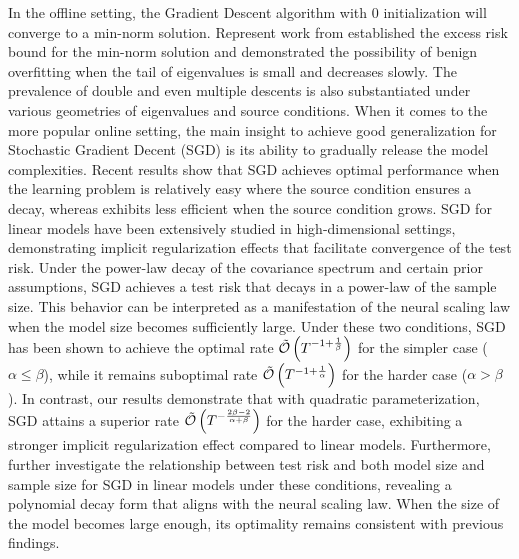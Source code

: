 
\iffalse

In the offline setting,  the Gradient Descent algorithm with $0$ initialization will converge to a min-norm solution. 
Represent work from \citep{} established the excess risk bound for the min-norm  solution and demonstrated the possibility of benign overfitting when the tail of eigenvalues is small and decreases slowly.   The prevalence of double and even multiple descents is also substantiated under various geometries of eigenvalues and source conditions.   When it comes to  the more popular online setting, the main insight to achieve good generalization for Stochastic Gradient Decent (SGD) is its ability to gradually release the model complexities. Recent results show that SGD achieves optimal performance when the learning problem is relatively easy where the source condition ensures a decay, whereas exhibits less efficient when the source condition grows.
SGD for linear models have been extensively studied in high-dimensional settings, demonstrating implicit regularization effects that facilitate convergence of the test risk. Under the power-law decay of the covariance spectrum and certain prior assumptions, SGD achieves a test risk that decays in a power-law of the sample size. This behavior can be interpreted as a manifestation of the neural scaling law when the model size becomes sufficiently large. 
Under these two conditions, SGD has been shown to achieve the optimal rate $\Tilde{\mathcal{O}} \left ( T^{-1+\frac{1}{\beta} } \right ) $ for the simpler case ($\alpha \le  \beta $), while it remains suboptimal rate $\Tilde{\mathcal{O}} \left ( T^{-1+\frac{1}{\alpha} } \right )$ for the harder case ($\alpha > \beta $). 
In contrast, our results demonstrate that with quadratic parameterization, SGD attains a superior rate $\Tilde{\mathcal{O}}\left(T^{-\frac{2\beta-2}{\alpha+\beta}}\right)$ for the harder case, exhibiting a stronger implicit regularization effect compared to linear models. 
Furthermore, \citet{lin2024scaling,bordelon2024a} further investigate the relationship between test risk and both model size and sample size for SGD in linear models under these conditions, revealing a polynomial decay form that aligns with the neural scaling law. When the size of the model becomes large enough, its optimality remains consistent with previous findings.
